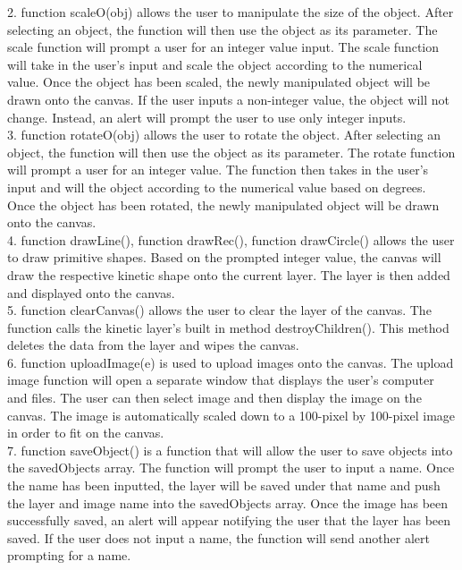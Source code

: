 \documentclass[a4paper, 11pt]{article} %
\begin{document}
2.	function scaleO(obj) allows the user to manipulate the size of the object. After selecting an object, the function will then use the object as its parameter. The scale function will prompt a user for an integer value input. The scale function will take in the user’s input and scale the object according to the numerical value. Once the object has been scaled, the newly manipulated object will be drawn onto the canvas. If the user inputs a non-integer value, the object will not change. Instead, an alert will prompt the user to use only integer inputs.\\


3.	function rotateO(obj) allows the user to rotate the object. After selecting an object, the function will then use the object as its parameter. The rotate function will prompt a user for an integer value. The function then takes in the user’s input and will the object according to the numerical value based on degrees. Once the object has been rotated, the newly manipulated object will be drawn onto the canvas.\\

4.	function drawLine(), function drawRec(), function drawCircle() allows the user to draw primitive shapes. Based on the prompted integer value, the canvas will draw the respective kinetic shape onto the current layer. The layer is then added and displayed onto the canvas.\\


5.	function clearCanvas() allows the user to clear the layer of the canvas. The function calls the kinetic layer’s built in method destroyChildren(). This method deletes the data from the layer and wipes the canvas.\\

6.	function uploadImage(e) is used to upload images onto the canvas. The upload image function will open a separate window that displays the user’s computer and files. The user can then select image and then display the image on the canvas. The image is automatically scaled down to a 100-pixel by 100-pixel image in order to fit on the canvas. \\


7.	function saveObject() is a function that will allow the user to save objects into the savedObjects array. The function will prompt the user to input a name. Once the name has been inputted, the layer will be saved under that name and push the layer and image name into the savedObjects array. Once the image has been successfully saved, an alert will appear notifying the user that the layer has been saved. If the user does not input a name, the function will send another alert prompting for a name. \\
\end{document}

